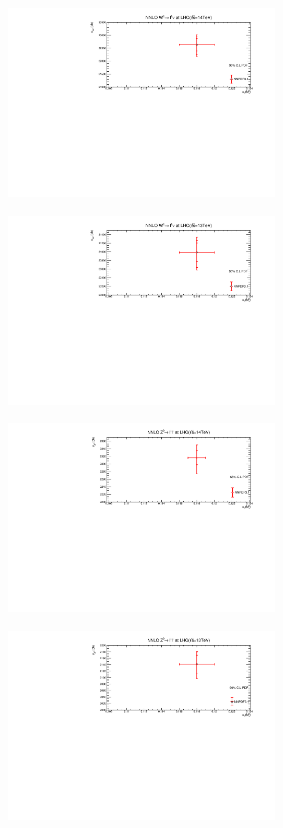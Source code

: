 \begin{figure}[H]
\centering
\begin{subfigure}{0.49\textwidth}
\includegraphics[height=5cm ,width=\textwidth]{chapter4/W14_90.pdf}
\vspace*{-8mm}
\caption{}
\label{w14_90}
\end{subfigure}
\begin{subfigure}{0.49\textwidth}
\includegraphics[height=5cm, width=\textwidth]{chapter4/W13_90.pdf}
\vspace*{-8mm}
\caption{}
\label{w13_90}
\end{subfigure}
\begin{subfigure}{0.49\textwidth}
\includegraphics[height=5cm, width=\textwidth]{chapter4/Z14.pdf}
\vspace*{-8mm}
\caption{}
\label{z14_90}
\end{subfigure}
\begin{subfigure}{0.49\textwidth}
\includegraphics[height=5cm, width=\textwidth]{chapter4/Z13_90.pdf}

\end{subfigure}
\end{figure}
